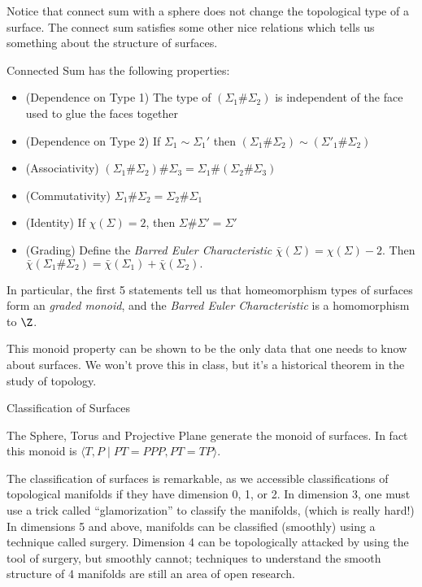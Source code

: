 Notice that connect sum with a sphere does not change the topological type of a surface. The connect sum satisfies some other nice relations which tells us something about the structure of surfaces. 
\begin{claim}
 Connected Sum has the following properties:
 \begin{itemize}
  \item (Dependence on Type 1) The type of $(\Sigma_1\#\Sigma_2)$ is independent of the face used to glue the faces together
  \item (Dependence on Type 2) If $\Sigma_1\sim \Sigma_1'$ then $(\Sigma_1\#\Sigma_2)\sim (\Sigma'_1\#\Sigma_2)$
  \item (Associativity) $(\Sigma_1\#\Sigma_2)\#\Sigma_3=\Sigma_1\#(\Sigma_2\#\Sigma_3)$
  \item (Commutativity) $\Sigma_1\# \Sigma_2=\Sigma_2\#\Sigma_1$
  \item (Identity) If $\chi(\Sigma)=2$, then $\Sigma\#\Sigma'=\Sigma'$
  \item (Grading) Define the \emph{Barred Euler Characteristic} $\bar\chi(\Sigma)=\chi(\Sigma)-2$. Then $ \bar\chi(\Sigma_1\# \Sigma_2)= \bar\chi(\Sigma_1)+\bar\chi(\Sigma_2). $ \footnotemark
 \end{itemize}
 In particular, the first 5 statements tell us that homeomorphism types of surfaces form an \emph{graded monoid}, and the \emph{Barred Euler Characteristic} is a homomorphism to $\Z$.    
\end{claim}
This monoid property can be shown to be \label{proj:classification} the only data that one needs to know about surfaces. We won't prove this in class, but it's a historical theorem in the study of topology. 

\begin{projectdescription}{Classification of Surfaces}


\begin{theorem}
 The Sphere, Torus and Projective Plane generate the monoid of surfaces. In fact this monoid is $\langle T, P \;|\; PT=PPP, PT=TP\rangle. $
\end{theorem}
The classification of surfaces is remarkable, as we accessible  classifications of topological manifolds if they have dimension 0, 1, or 2.  In dimension 3, one must use a trick called ``glamorization'' to classify the manifolds, (which is really hard!) In dimensions 5 and above, manifolds can be classified (smoothly) using a technique called surgery. Dimension 4 can be topologically attacked by using the tool of surgery, but smoothly cannot; techniques to understand the smooth structure of 4 manifolds are still an area of open research.
\end{projectdescription} 


